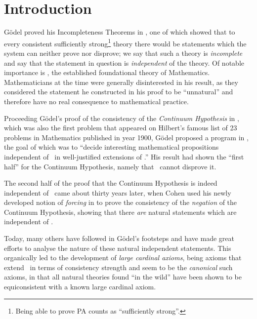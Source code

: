 \documentclass[../main]{subfiles}
\begin{document}
\chapter{Introduction}
\thispagestyle{fancy}

\setlength{\parindent}{18pt}
\begin{onehalfspacing}

G\"odel proved his Incompleteness Theorems in \cite{godel-incompleteness}, one of which showed that to every consistent sufficiently strong\footnote{Being able to prove \textsf{PA} counts as ``sufficiently strong''.} theory there would be statements which the system can neither prove nor disprove; we say that such a theory is \textit{incomplete} and say that the statement in question is \textit{independent} of the theory. Of notable importance is \zfc, the established foundational theory of Mathematics. Mathematicians at the time were generally disinterested in his result, as they considered the statement he constructed in his proof to be ``unnatural'' and therefore have no real consequence to mathematical practice.

\quad Proceeding G\"odel's proof of the consistency of the \textit{Continuum Hypothesis} in \cite{godel-continuum}, which was also the first problem that appeared on Hilbert's famous list of 23 problems in Mathematics published in year 1900, G\"odel proposed a program in \cite{godel-continuum-problem}, the goal of which was to ``decide interesting mathematical propositions independent of \zfc\ in well-justified extensions of \zfc.'' His result had shown the ``first half'' for the Continuum Hypothesis, namely that \zfc\ cannot disprove it.

\quad The second half of the proof that the Continuum Hypothesis is indeed independent of \zfc\ came about thirty years later, when Cohen used his newly developed notion of \textit{forcing} in \cite{cohen} to prove the consistency of the \textit{negation} of the Continuum Hypothesis, showing that there \textit{are} natural statements which are independent of \zfc.

\quad Today, many others have followed in G\"odel's footsteps and have made great efforts to analyse the nature of these natural independent statements. This organically led to the development of \textit{large cardinal axioms}, being axioms that extend \zfc\ in terms of consistency strength and seem to be the \textit{canonical} such axioms, in that all natural theories found ``in the wild'' have been shown to be equiconsistent with a known large cardinal axiom.


\end{onehalfspacing}
\end{document}
